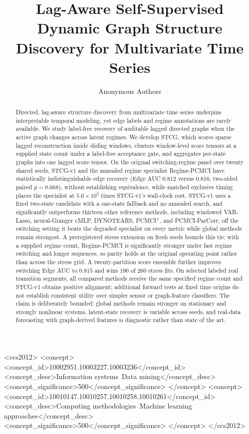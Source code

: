 \documentclass[sigconf,anonymous]{acmart}
\title{Lag-Aware Self-Supervised Dynamic Graph Structure Discovery for Multivariate Time Series}
\author{Anonymous Authors}
\affiliation{%
  \institution{Anonymous Institution}
  \city{Anonymous City}
  \country{Anonymous Country}}
\begin{document}
\begin{abstract}
Directed, lag-aware structure discovery from multivariate time series underpins interpretable temporal modeling, yet edge labels and regime annotations are rarely available.
We study label-free recovery of auditable lagged directed graphs when the active graph changes across latent regimes.
We develop STCG, which scores sparse lagged reconstruction inside sliding windows, clusters window-level score tensors at a supplied state count under a label-free acceptance gate, and aggregates per-state graphs into one lagged score tensor.
On the original switching-regime panel over twenty shared seeds, STCG-v1 and the annealed regime specialist Regime-PCMCI have statistically indistinguishable edge recovery (Edge AUC $0.812$ versus $0.816$, two-sided paired $p=0.668$), without establishing equivalence, while matched exclusive timing places the specialist at $5.6\times10^{3}$ times STCG-v1's wall-clock cost. STCG-v1 uses a fixed two-state candidate with a one-state fallback and no annealed search, and significantly outperforms thirteen other reference methods, including windowed VAR-Lasso, neural-Granger cMLP, DYNOTEARS, PCMCI$^+$, and PCMCI-ParCorr; off the switching setting it beats the degraded specialist on every metric while global methods remain strongest.
A preregistered stress extension on fresh seeds bounds this tie: with a supplied regime count, Regime-PCMCI is significantly stronger under fast regime switching and longer sequences, so parity holds at the original operating point rather than across the stress grid. A twenty-partition score ensemble further improves switching Edge AUC to $0.815$ and wins 190 of 260 stress fits.
On selected labeled real transition segments, all compared methods receive the same specified regime count and STCG-v1 obtains positive alignment; additional forward tests at fixed time origins do not establish consistent utility over simpler sensor or graph-feature classifiers.
The claim is deliberately bounded: global methods remain stronger on stationary and strongly nonlinear systems, latent-state recovery is variable across seeds, and real-data forecasting with graph-derived features is diagnostic rather than state of the art.
\end{abstract}

\begin{CCSXML}
<ccs2012>
   <concept>
       <concept_id>10002951.10003227.10003236</concept_id>
       <concept_desc>Information systems~Data mining</concept_desc>
       <concept_significance>500</concept_significance>
   </concept>
   <concept>
       <concept_id>10010147.10010257.10010258.10010261</concept_id>
       <concept_desc>Computing methodologies~Machine learning approaches</concept_desc>
       <concept_significance>500</concept_significance>
   </concept>
</ccs2012>
\end{CCSXML}
\end{document}
